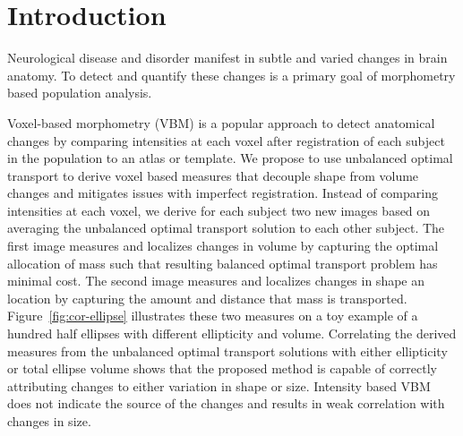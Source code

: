 \documentclass{llncs}
\begin{document}
\section{Introduction}
Neurological disease and disorder manifest in subtle and varied changes in
brain anatomy. To detect and quantify these changes is a primary goal of
morphometry based population analysis. 

Voxel-based morphometry (VBM) is a popular approach to detect anatomical
changes by comparing intensities at each voxel after registration of each
subject in the population to an atlas or template. We propose to use unbalanced
optimal transport to derive voxel based measures that decouple shape from
volume changes and mitigates issues with imperfect registration.
Instead of comparing intensities at each voxel, we derive for each subject two
new images based on averaging the unbalanced optimal transport solution to each
other subject. The first image measures and localizes changes in volume by
capturing the optimal allocation of mass such that resulting balanced optimal
transport problem has minimal cost. The second image measures and localizes
changes in shape an location by capturing the amount and distance that mass is
transported. Figure~\ref{fig:cor-ellipse} illustrates these two measures on a
toy example of a hundred half ellipses with different ellipticity and volume.
Correlating the derived measures from the unbalanced optimal transport
solutions with either ellipticity or total ellipse volume shows that the
proposed method is capable of correctly attributing changes to either variation
in shape or size. Intensity based VBM does not indicate the source of the
changes and results in weak correlation with changes in size.
\end{document}
